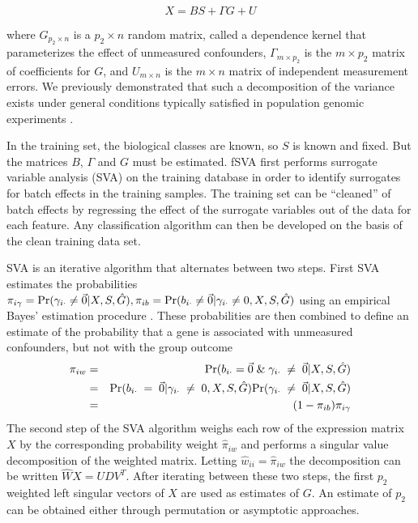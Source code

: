 \documentclass[letterpaper,12pt]{article}\usepackage[]{graphicx}\usepackage[]{color}
\newcommand{\p}{{\rm Pr}}
\begin{document}
\begin{equation}
X = BS + \Gamma G + U
\label{full_expression_matrix}
\end{equation}

where $G_{p_2 \times n}$ is a $p_2 \times n$ random matrix, called a dependence kernel \citep{Leek2008} that parameterizes the effect of unmeasured confounders, $\Gamma_{m \times p_2}$ is the $m \times p_2$ matrix of coefficients for $G$, and $U_{m\times n}$ is the $m \times n$ matrix of independent measurement errors. We previously demonstrated that such a decomposition of the variance exists under general conditions typically satisfied in population genomic experiments \citep{Leek2008}. 

In the training set, the biological classes are known, so $S$ is known and fixed. But the matrices $B$, $\Gamma$ and $G$ must be estimated. fSVA first performs surrogate variable analysis (SVA) on the training database in order to identify surrogates for batch effects in the training samples. The training set can be ``cleaned'' of batch effects by regressing the effect of the surrogate variables out of the data for each feature. Any classification algorithm can then be developed on the basis of the clean training data set. 

SVA is an iterative algorithm that alternates between two steps. First SVA estimates the probabilities $\pi_{i\gamma} = \p(\gamma_{i\cdot} \neq \vec{0}| X, S, \hat{G}), \pi_{ib} = \p(b_{i\cdot} \neq \vec{0}| \gamma_{i\cdot} \neq 0, X, S, \hat{G})$ using an empirical Bayes' estimation procedure \citep{Leek2008,Efron2004b,Storey2005}. These probabilities are then combined to define an estimate of the probability that a gene is associated with unmeasured confounders, but not with the group outcome
\begin{eqnarray*}
\pi_{iw} &=& \p(b_{i\cdot} = \vec{0} \; \& \; \gamma_{i\cdot} \;\neq\; \vec{0} | X,S,\hat{G})\\
& = & \p(b_{i\cdot} \; = \; \vec{0}| \gamma_{i\cdot} \; \neq\; 0, X, S, \hat{G}) \p(\gamma_{i\cdot} \; \neq\; \vec{0}| X, S, \hat{G})\\
&=& (1-\pi_{ib})\pi_{i\gamma}
\end{eqnarray*}
The second step of the SVA algorithm weighs each row of the expression matrix $X$ by the corresponding probability weight $\hat{\pi}_{iw}$ and performs a singular value decomposition of the weighted matrix. Letting $\hat{w}_{ii} = \hat{\pi}_{iw}$ the decomposition can be written $\hat{W}X = UDV^T$. After iterating between these two steps, the first $p_2$ weighted left singular vectors of $X$ are used as estimates of $G$. An estimate of $p_2$ can be obtained either through permutation \citep{Buja1992} or asymptotic \citep{Leek2011} approaches. 
\end{document}
